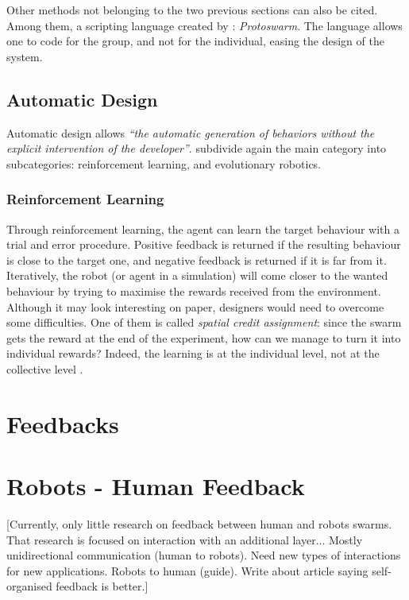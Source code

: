 \documentclass[a4paper, 12pt]{report}
\newcommand{\quot}[1]{\textit{\enquote{#1}}}
\begin{document}
			Other methods not belonging to the two previous sections can also be cited. Among them, a scripting language created by \citet{bachrach2010composable}: \emph{Protoswarm}. The language allows one to code for the group, and not for the individual, easing the design of the system.
		
		\subsection{Automatic Design}
		
		Automatic design allows \quot{the automatic generation of behaviors without the explicit intervention of the developer}\citep{brambilla2013swarm}. \citeauthor{brambilla2013swarm} subdivide again the main category into subcategories: reinforcement learning, and evolutionary robotics.
		
			\subsubsection{Reinforcement Learning}
			
			Through reinforcement learning, the agent can learn the target behaviour with a trial and error procedure. Positive feedback is returned if the resulting behaviour is close to the target one, and negative feedback is returned if it is far from it. Iteratively, the robot (or agent in a simulation) will come closer to the wanted behaviour by trying to maximise the rewards received from the environment. Although it may look interesting on paper, designers would need to overcome some difficulties. One of them is called \emph{spatial credit assignment}: since the swarm gets the reward at the end of the experiment, how can we manage to turn it into individual rewards? Indeed, the learning is at the individual level, not at the collective level \citep{wolpert1999introduction}.
	\section{Feedbacks}
	\section{Robots - Human Feedback}
	
[Currently, only little research on feedback between human and robots swarms. That research is focused on interaction with an additional layer... Mostly unidirectional communication (human to robots). Need new types of interactions for new applications. Robots to human (guide). Write about article saying self-organised feedback is better.]
\end{document}
